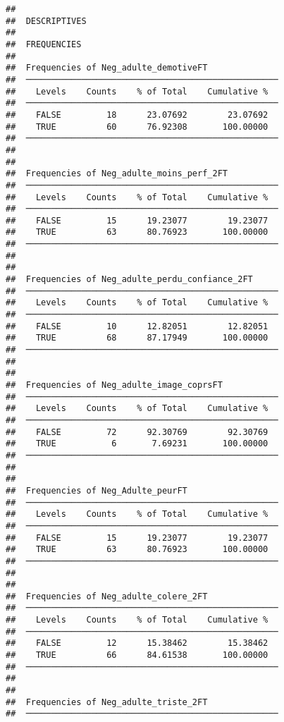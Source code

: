 \documentclass[
]{article}
\begin{document}
\begin{verbatim}
## 
##  DESCRIPTIVES
## 
##  FREQUENCIES
## 
##  Frequencies of Neg_adulte_demotiveFT               
##  ────────────────────────────────────────────────── 
##    Levels    Counts    % of Total    Cumulative %   
##  ────────────────────────────────────────────────── 
##    FALSE         18      23.07692        23.07692   
##    TRUE          60      76.92308       100.00000   
##  ────────────────────────────────────────────────── 
## 
## 
##  Frequencies of Neg_adulte_moins_perf_2FT           
##  ────────────────────────────────────────────────── 
##    Levels    Counts    % of Total    Cumulative %   
##  ────────────────────────────────────────────────── 
##    FALSE         15      19.23077        19.23077   
##    TRUE          63      80.76923       100.00000   
##  ────────────────────────────────────────────────── 
## 
## 
##  Frequencies of Neg_adulte_perdu_confiance_2FT      
##  ────────────────────────────────────────────────── 
##    Levels    Counts    % of Total    Cumulative %   
##  ────────────────────────────────────────────────── 
##    FALSE         10      12.82051        12.82051   
##    TRUE          68      87.17949       100.00000   
##  ────────────────────────────────────────────────── 
## 
## 
##  Frequencies of Neg_adulte_image_coprsFT            
##  ────────────────────────────────────────────────── 
##    Levels    Counts    % of Total    Cumulative %   
##  ────────────────────────────────────────────────── 
##    FALSE         72      92.30769        92.30769   
##    TRUE           6       7.69231       100.00000   
##  ────────────────────────────────────────────────── 
## 
## 
##  Frequencies of Neg_Adulte_peurFT                   
##  ────────────────────────────────────────────────── 
##    Levels    Counts    % of Total    Cumulative %   
##  ────────────────────────────────────────────────── 
##    FALSE         15      19.23077        19.23077   
##    TRUE          63      80.76923       100.00000   
##  ────────────────────────────────────────────────── 
## 
## 
##  Frequencies of Neg_adulte_colere_2FT               
##  ────────────────────────────────────────────────── 
##    Levels    Counts    % of Total    Cumulative %   
##  ────────────────────────────────────────────────── 
##    FALSE         12      15.38462        15.38462   
##    TRUE          66      84.61538       100.00000   
##  ────────────────────────────────────────────────── 
## 
## 
##  Frequencies of Neg_adulte_triste_2FT               
##  ────────────────────────────────────────────────── 

\end{verbatim}
\end{document}
